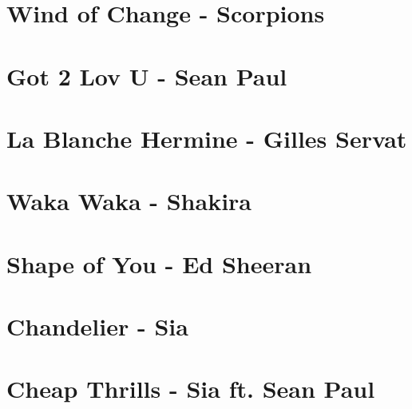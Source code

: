 \documentclass[11pt]{article}
\begin{document}
\section*{Wind of Change - Scorpions}
\begin{guitar}

\end{guitar}

\section{Got 2 Lov U - Sean Paul}
\begin{guitar}

\end{guitar}



\section{La Blanche Hermine - Gilles Servat}
\begin{guitar}

\end{guitar}

\section{Waka Waka - Shakira}
\begin{guitar}

\end{guitar}

\section{Shape of You - Ed Sheeran}
\begin{guitar}

\end{guitar}



\section{Chandelier - Sia}
\begin{guitar}

\end{guitar}

\section{Cheap Thrills - Sia ft. Sean Paul}

\end{document}
